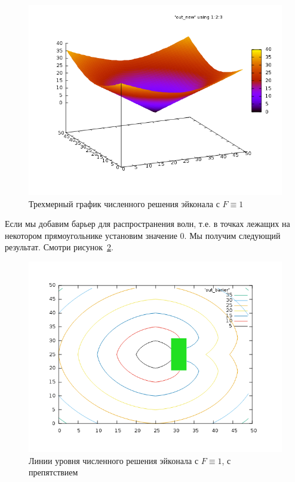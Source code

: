 \begin{figure}[H]
  \centering
  \includegraphics[width=\linewidth]{img/eikonal_simple_3d.png}
  \hfil \caption{Трехмерный график численного решения эйконала с $F\equiv 1$}
  \label{fig:eikonal-surface-3d}
\end{figure}

Если мы добавим барьер для распространения волн, т.е. в точках лежащих
на некотором прямоугольнике установим значение $0$. Мы получим
следующий результат. Смотри рисунок~\ref{fig:barier_surface}.

\begin{figure}[H]
  \centering
  \includegraphics[width=\linewidth]{img/barier_surface.png}
  \hfil \caption{Линии уровня численного решения эйконала с $F\equiv
    1$, с препятствием}
  \label{fig:barier_surface}
\end{figure}

